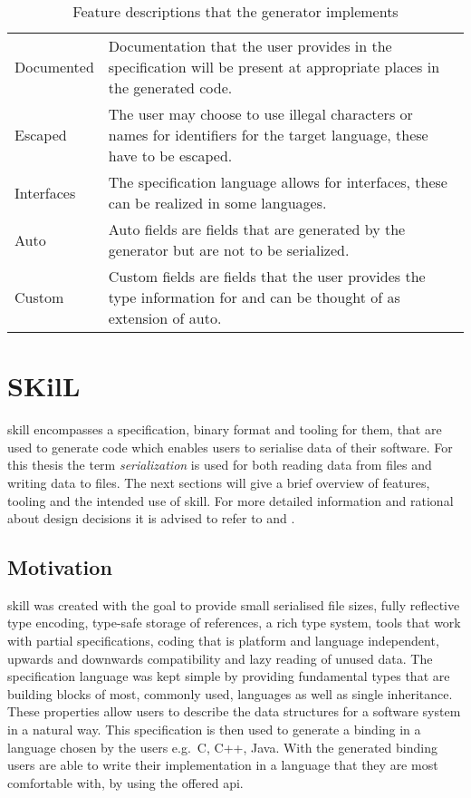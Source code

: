 \documentclass[thesis]{subfiles}
\begin{document}
  \begin{table}
    \begin{tabu}to\linewidth{lX}
      Documented
       & Documentation that the user provides in the specification will be present at appropriate places in the generated code.\autocite{skill-tr}    \\
      Escaped
       & The user may choose to use illegal characters or names for identifiers for the target language, these have to be escaped.\autocite{skill-tr} \\
      Interfaces
       & The specification language allows for interfaces, these can be realized in some languages.\autocite{skill-tr}                                \\
      Auto
       & Auto fields are fields that are generated by the generator but are not to be serialized.\autocite{skill-tr}                                  \\
      Custom
       & Custom fields are fields that the user provides the type information for and can be thought of as extension of auto.\autocite{skill-tr}      \\
    \end{tabu}
    \caption{Feature descriptions that the generator implements}\label{tab:feat}
  \end{table}

\section{SKilL}\label{sec:skill}
  \gls{skill} encompasses a specification, binary format and tooling for them, that are used to generate code which enables users to serialise data of their software.
  For this thesis the term \emph{serialization} is used for both reading data from files and writing data to files.
  The next sections will give a brief overview of features, tooling and the intended use of \gls{skill}.
  For more detailed information and rational about design decisions it is advised to refer to \autocite{skill-tr} and \autocite{skill-dis}.

  \subsection{Motivation}
    \gls{skill} was created with the goal to provide small serialised file sizes, fully reflective type encoding, type-safe storage of references, a rich type system, tools that work with partial specifications,
    coding that is platform and language independent, upwards and downwards compatibility and lazy reading of unused data.
    The specification language was kept simple by providing fundamental types that are building blocks of most, commonly used, languages as well as single inheritance.
    These properties allow users to describe the data structures for a software system in a natural way.
    This specification is then used to generate a binding in a language chosen by the users e.g.~C, C++, Java.
    With the generated binding users are able to write their implementation in a language that they are most comfortable with, by using the offered \gls{api}.%
    ~\autocite{skill-tr}
\end{document}
